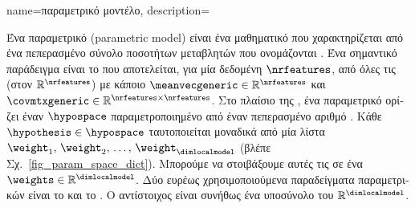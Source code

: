 {name={\foreignlanguage{greek}{παραμετρικό μοντέλο}},
	description={\foreignlanguage{greek}{Ένα παραμετρικό}  (parametric model) 
		\foreignlanguage{greek}{εί\-ναι ένα μαθηματικό}  \foreignlanguage{greek}{που χαρακτηρίζεται από ένα πεπερασμένο σύνολο 
		ποσοτήτων μεταβλητών που ονομάζονται} . \foreignlanguage{greek}{Ένα σημαντικό παράδειγμα είναι το}
		 \foreignlanguage{greek}{που αποτελείται, για μία δεδομένη}  $\nrfeatures$, 
		\foreignlanguage{greek}{από όλες τις}  (\foreignlanguage{greek}{στον}  
		$\mathbb{R}^{\nrfeatures}$) \foreignlanguage{greek}{με κάποιο}  
		$\meanvecgeneric \in \mathbb{R}^{\nrfeatures}$ \foreignlanguage{greek}{και}  
		$\covmtxgeneric \in \mathbb{R}^{\nrfeatures \times \nrfeatures}$.
        		\foreignlanguage{greek}{Στο πλαίσιο της} , \foreignlanguage{greek}{ένα παραμετρικό}  
		\foreignlanguage{greek}{ορίζει έναν}  $\hypospace$ \foreignlanguage{greek}{παραμετροποιημένο από έναν 
		πεπερασμένο αριθμό} . \foreignlanguage{greek}{Κάθε}  $\hypothesis \in \hypospace$ 
		\foreignlanguage{greek}{ταυτοποιείται μοναδικά από μία λίστα}  
		$\weight_{1}, \,\weight_{2}, \,\ldots, \,\weight_{\dimlocalmodel}$ 
		(\foreignlanguage{greek}{βλέπε Σχ.}\ \ref{fig_param_space_dict}). \foreignlanguage{greek}{Μπορούμε να στοιβάξουμε αυτές τις}  
		 \foreignlanguage{greek}{σε ένα}  $\weights \in \mathbb{R}^{\dimlocalmodel}$. 
		\foreignlanguage{greek}{Δύο ευρέως χρησιμοποιούμενα παραδείγματα παραμετρικών}  \foreignlanguage{greek}{είναι το} 
		 \foreignlanguage{greek}{και το} . \foreignlanguage{greek}{Ο αντίστοιχος}  
		\foreignlanguage{greek}{είναι συνήθως ένα υποσύνολο του} $\mathbb{R}^{\dimlocalmodel}$.
		\begin{figure}[H]
			\begin{center}
\end{center}
\end{figure}}}
